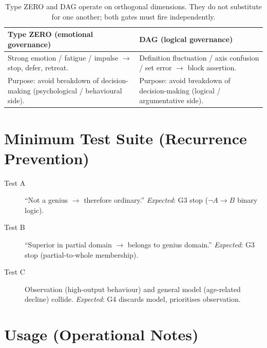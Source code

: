 \begin{table}[ht]
\centering
\small
\begin{tabularx}{\linewidth}{XX}
\toprule
\textbf{Type ZERO (emotional governance)}
& \textbf{DAG (logical governance)} \\
\midrule
Strong emotion / fatigue / impulse $\to$ stop, defer, retreat.
& Definition fluctuation / axis confusion / set error $\to$ block
assertion. \\
Purpose: avoid breakdown of decision-making
(psychological / behavioural side).
& Purpose: avoid breakdown of decision-making
(logical / argumentative side). \\
\bottomrule
\end{tabularx}
\caption[Type ZERO vs DAG]{Type ZERO and DAG operate on orthogonal
dimensions. They do not substitute for one another; both gates must
fire independently.}
\label{tab:type-zero-vs-dag}
\end{table}

\clearpage
\section{Minimum Test Suite (Recurrence Prevention)}
\label{sec:dag-tests}

\begin{description}
\item[Test A] ``Not a genius $\to$ therefore ordinary.''
\textit{Expected}: G3 stop ($\neg A \to B$ binary logic).
\item[Test B] ``Superior in partial domain $\to$ belongs to genius
domain.'' \textit{Expected}: G3 stop (partial-to-whole membership).
\item[Test C] Observation (high-output behaviour) and general model
(age-related decline) collide. \textit{Expected}: G4 discards model,
prioritises observation.
\end{description}

\section{Usage (Operational Notes)}
\label{sec:dag-usage}


